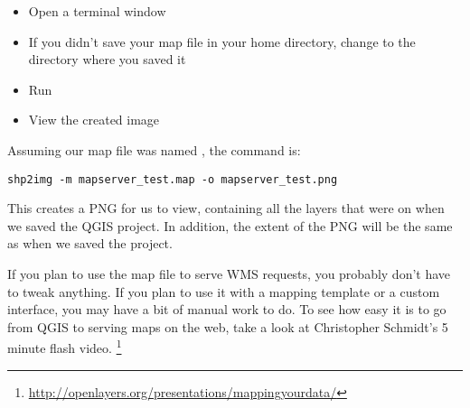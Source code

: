 \begin{itemize}
\item Open a terminal window
\item If you didn't save your map file in your home directory, change to
  the directory where you saved it
\item Run  
\item View the created image 
\end{itemize}
 
Assuming our map file was named , the
 command is:

\begin{verbatim}
shp2img -m mapserver_test.map -o mapserver_test.png
\end{verbatim}

This creates a PNG for us to view, containing all the layers that were on
when we saved the QGIS project. In addition, the extent of the PNG will be the same as
when we saved the project.

If you plan to use the map file to serve WMS requests, you probably don't
have to tweak anything. If you plan to use it with a mapping template or a
custom interface, you may have a bit of manual work to do. To see how easy
it is to go from QGIS to serving maps on the web, take a look at
Christopher Schmidt's 5 minute flash video.
\footnote{\url{http://openlayers.org/presentations/mappingyourdata/}}
